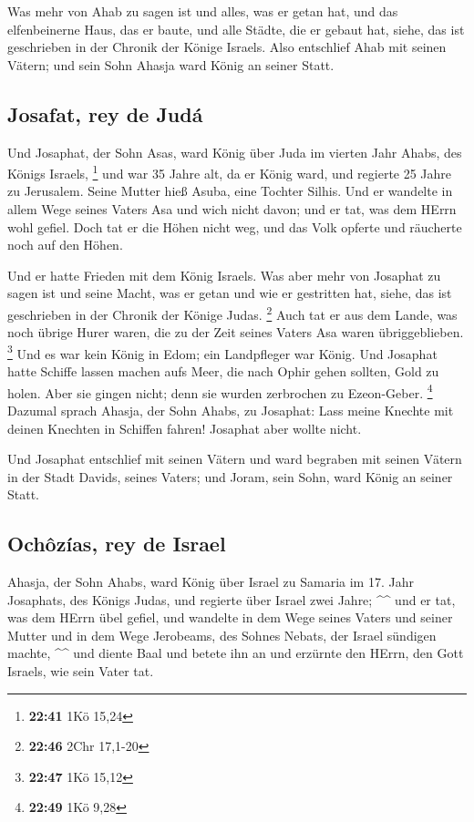  Was mehr von Ahab zu sagen ist und alles, was er getan
hat, und das elfenbeinerne Haus, das er baute, und alle Städte, die er
gebaut hat, siehe, das ist geschrieben in der Chronik der Könige
Israels.  Also entschlief Ahab mit seinen Vätern; und
sein Sohn Ahasja ward König an seiner Statt.

\hypertarget{josafat-rey-de-juduxe1}{%
\subsection{Josafat, rey de Judá}\label{josafat-rey-de-juduxe1}}

 Und Josaphat, der Sohn Asas, ward König über Juda im
vierten Jahr Ahabs, des Königs Israels, \footnote{\textbf{22:41} 1Kö
  15,24}  und war 35 Jahre alt, da er König ward, und
regierte 25 Jahre zu Jerusalem. Seine Mutter hieß Asuba, eine Tochter
Silhis.  Und er wandelte in allem Wege seines Vaters Asa
und wich nicht davon; und er tat, was dem HErrn wohl gefiel.
 Doch tat er die Höhen nicht weg, und das Volk opferte
und räucherte noch auf den Höhen.

 Und er hatte Frieden mit dem König Israels.
 Was aber mehr von Josaphat zu sagen ist und seine Macht,
was er getan und wie er gestritten hat, siehe, das ist geschrieben in
der Chronik der Könige Judas. \footnote{\textbf{22:46} 2Chr 17,1-20}
 Auch tat er aus dem Lande, was noch übrige Hurer waren,
die zu der Zeit seines Vaters Asa waren übriggeblieben. \footnote{\textbf{22:47}
  1Kö 15,12}  Und es war kein König in Edom; ein
Landpfleger war König.  Und Josaphat hatte Schiffe lassen
machen aufs Meer, die nach Ophir gehen sollten, Gold zu holen. Aber sie
gingen nicht; denn sie wurden zerbrochen zu Ezeon-Geber. \footnote{\textbf{22:49}
  1Kö 9,28}  Dazumal sprach Ahasja, der Sohn Ahabs, zu
Josaphat: Lass meine Knechte mit deinen Knechten in Schiffen fahren!
Josaphat aber wollte nicht.

 Und Josaphat entschlief mit seinen Vätern und ward
begraben mit seinen Vätern in der Stadt Davids, seines Vaters; und
Joram, sein Sohn, ward König an seiner Statt.

\hypertarget{ochuxf4zuxedas-rey-de-israel}{%
\subsection{Ochôzías, rey de
Israel}\label{ochuxf4zuxedas-rey-de-israel}}

 Ahasja, der Sohn Ahabs, ward König über Israel zu
Samaria im 17. Jahr Josaphats, des Königs Judas, und regierte über
Israel zwei Jahre; \^{}\^{}  und er tat, was dem HErrn
übel gefiel, und wandelte in dem Wege seines Vaters und seiner Mutter
und in dem Wege Jerobeams, des Sohnes Nebats, der Israel sündigen
machte, \^{}\^{}  und diente Baal und betete ihn an und
erzürnte den HErrn, den Gott Israels, wie sein Vater tat.
